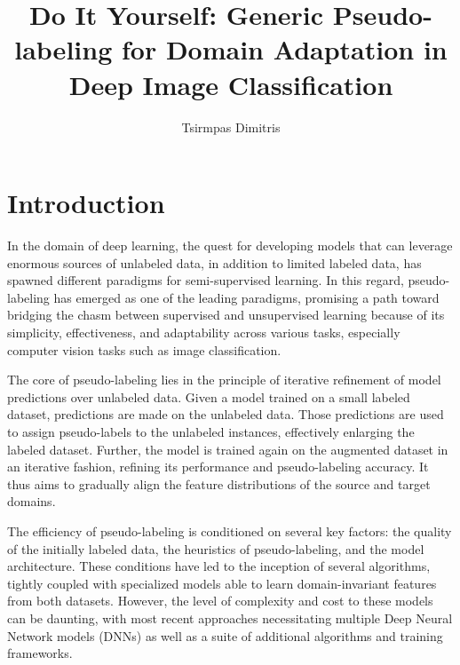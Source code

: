 \documentclass{article}
\title{\Huge Do It Yourself: Generic Pseudo-labeling for Domain Adaptation in Deep Image Classification}
\author{\LARGE Tsirmpas Dimitris}
\begin{document}
	\begin{titlepage}
		\maketitle
		\thispagestyle{empty} %
			
	\end{titlepage}
	
	\maketitle
	
	
	\section{Introduction}
	
	In the domain of deep learning, the quest for developing models that can leverage enormous sources of unlabeled data, in addition to limited labeled data, has spawned different paradigms for semi-supervised learning. In this regard, pseudo-labeling has emerged as one of the leading paradigms, promising a path toward bridging the chasm between supervised and unsupervised learning because of its simplicity, effectiveness, and adaptability across various tasks, especially computer vision tasks such as image classification. 
	
	The core of pseudo-labeling lies in the principle of iterative refinement of model predictions over unlabeled data. Given a model trained on a small labeled dataset, predictions are made on the unlabeled data. Those predictions are used to assign pseudo-labels to the unlabeled instances, effectively enlarging the labeled dataset. Further, the model is trained again on the augmented dataset in an iterative fashion, refining its performance and pseudo-labeling accuracy. It thus aims to gradually align the feature distributions of the source and target domains.
	
	The efficiency of pseudo-labeling is conditioned on several key factors: the quality of the initially labeled data, the heuristics of pseudo-labeling, and the model architecture. These conditions have led to the inception of several algorithms, tightly coupled with specialized models able to learn domain-invariant features from both datasets. However, the level of complexity and cost to these models can be daunting, with most recent approaches necessitating multiple Deep Neural Network models (DNNs) as well as a suite of additional algorithms and training frameworks. 
	
\end{document}
